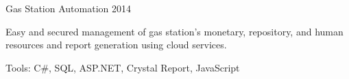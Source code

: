 \begin{cventries}
  \cventry
    {} %
    {Gas Station Automation} %
    {2014} %
    {} %
    {
      \vspace{-3mm}
      \begin{cvitems} %
        \item {Easy and secured management of gas station's monetary, repository, and human resources and report generation using cloud services.}
        \item {Tools: C\#, SQL, ASP.NET, Crystal Report, JavaScript}
      \end{cvitems}
    }
    {}

\end{cventries}
